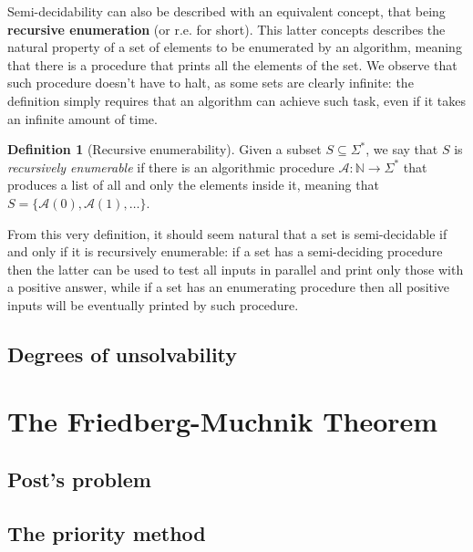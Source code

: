 \documentclass[12pt,a4paper]{article}
\theoremstyle{definition}
\newtheorem{definition}{Definition}
\newcommand{\N}{\mathbb{N}}                     %
\begin{document}
    Semi-decidability can also be described with an equivalent concept, that being \textbf{recursive enumeration} (or r.e. for short). This latter concepts describes the natural property of a set of elements to be enumerated by an algorithm, meaning that there is a procedure that prints all the elements of the set. We observe that such procedure doesn't have to halt, as some sets are clearly infinite: the definition simply requires that an algorithm can achieve such task, even if it takes an infinite amount of time. 

    \begin{definition}[Recursive enumerability]
        Given a subset $S \subseteq \Sigma^*$, we say that $S$ is \textit{recursively enumerable} if there is an algorithmic procedure $\mathcal{A} : \N \to \Sigma^*$ that produces a list of all and only the elements inside it, meaning that $S = \{\mathcal{A}(0), \mathcal{A}(1), \ldots\}$.
    \end{definition}

    From this very definition, it should seem natural that a set is semi-decidable if and only if it is recursively enumerable: if a set has a semi-deciding procedure then the latter can be used to test all inputs in parallel and print only those with a positive answer, while if a set has an enumerating procedure then all positive inputs will be eventually printed by such procedure. 

    \subsection{Degrees of unsolvability}

    \section{The Friedberg-Muchnik Theorem}

    \subsection{Post's problem}

    \subsection{The priority method}
\end{document}
